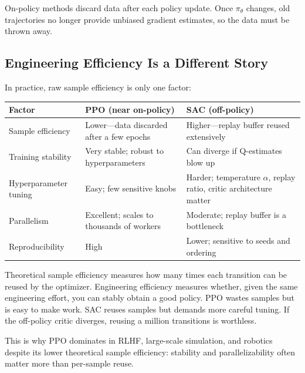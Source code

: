 On-policy methods discard data after each policy update. Once $\pi_\theta$ changes, old trajectories no longer provide unbiased gradient estimates, so the data must be thrown away.

\subsection{Engineering Efficiency Is a Different Story}

In practice, raw sample efficiency is only one factor:

\begin{center}
\begin{tabular}{@{} l p{5.5cm} p{5.5cm} @{}}
\toprule
\textbf{Factor} & \textbf{PPO (near on-policy)} & \textbf{SAC (off-policy)} \\
\midrule
Sample efficiency & Lower---data discarded after a few epochs & Higher---replay buffer reused extensively \\
Training stability & Very stable; robust to hyperparameters & Can diverge if Q-estimates blow up \\
Hyperparameter tuning & Easy; few sensitive knobs & Harder; temperature $\alpha$, replay ratio, critic architecture matter \\
Parallelism & Excellent; scales to thousands of workers & Moderate; replay buffer is a bottleneck \\
Reproducibility & High & Lower; sensitive to seeds and ordering \\
\bottomrule
\end{tabular}
\end{center}

\begin{keyidea}
Theoretical sample efficiency measures how many times each transition can be reused by the optimizer. Engineering efficiency measures whether, given the same engineering effort, you can stably obtain a good policy. PPO wastes samples but is easy to make work. SAC reuses samples but demands more careful tuning. If the off-policy critic diverges, reusing a million transitions is worthless.
\end{keyidea}

This is why PPO dominates in RLHF, large-scale simulation, and robotics despite its lower theoretical sample efficiency: stability and parallelizability often matter more than per-sample reuse.

